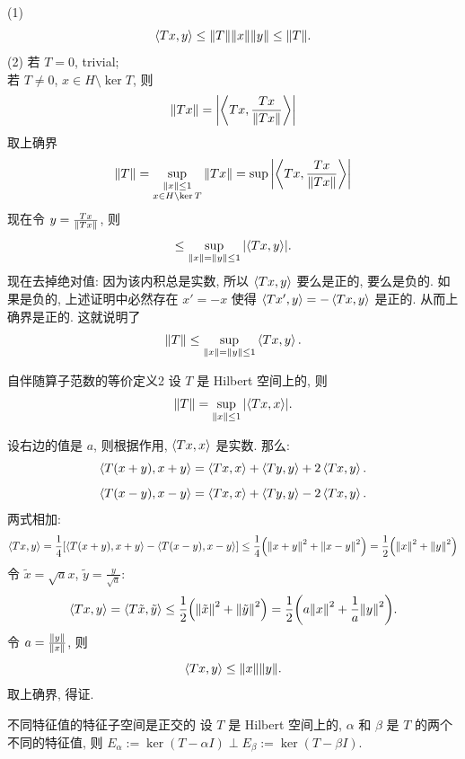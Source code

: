        \begin{prf}
            (1) 
            \[\expval{Tx, y}\leq\norm{T}\norm{x}\norm{y}\leq\norm{T}.  \]
            (2) 若 \(T=0\), trivial;\\
            若 \(T\neq 0\), \(x\in H\setminus\ker T\), 则
            \[\norm{Tx}=\abs{\expval{Tx, \frac{Tx}{\norm{Tx}}}}\]
            取上确界
            \[\norm{T}=\sup_{\substack{\norm{x}\leq 1 \\ x\in H\setminus\ker T}}\norm{Tx}=\sup\abs{\expval{Tx, \frac{Tx}{\norm{Tx}}}} \]
            现在令 \(y=\frac{Tx}{\norm{Tx}}\), 则
            \[\leq\sup_{\substack{\norm{x}=\norm{y}\leq 1}}\abs{\expval{Tx, y}}.\]
            现在去掉绝对值: 因为该内积总是实数, 所以 \(\expval{Tx, y}\) 要么是正的, 要么是负的. 如果是负的, 上述证明中必然存在 \(x'=-x\) 使得 \(\expval{Tx', y}=-\expval{Tx, y}\) 是正的. 从而上确界是正的. 这就说明了
            \[\norm{T}\leq\sup_{\substack{\norm{x}=\norm{y}\leq 1}}\expval{Tx, y}.\]
        \end{prf}

        \begin{thm}
            {自伴随算子范数的等价定义2}
            设 \(T\) 是 Hilbert 空间上的\SelfAdjOp{}, 则
            \[\norm{T}=\sup_{\norm{x}\leq 1}\abs{\expval{Tx, x}}.\]
        \end{thm}

        \begin{prf}
            设右边的值是 \(a\), 则根据\SelfAdjOp{}作用, \(\expval{Tx, x}\) 是实数. 那么:
            \[\expval{T(x+y), x+y}=\expval{Tx, x}+\expval{Ty, y}+2\expval{Tx, y}.\]
            \[\expval{T(x-y), x-y}=\expval{Tx, x}+\expval{Ty, y}-2\expval{Tx, y}.\]
            两式相加:
            \[\expval{Tx, y} = \frac{1}{4}[\expval{T(x+y), x+y}-\expval{T(x-y), x-y}]\leq\frac{1}{4}\qty(\norm{x+y}^2+\norm{x-y}^2)=\frac{1}{2}\qty(\norm{x}^2+\norm{y}^2) \]
            令 \(\tilde{x}=\sqrt{a}x\), \(\tilde{y}=\frac{y}{\sqrt{a}}\):
            \[\expval{Tx,y}=\expval{T\tilde{x}, \tilde{y}} \leq \frac{1}{2}\qty(\norm{\tilde{x}}^2+\norm{\tilde{y}}^2)=\frac{1}{2}\qty(a\norm{x}^2+\frac{1}{a}\norm{y}^2).\]
            令 \(a=\frac{\norm{y}}{\norm{x}}\), 则
            \[\expval{Tx, y} \leq \norm{x}\norm{y}.\]
            取上确界, 得证.
        \end{prf}

        \begin{thm}
            {不同特征值的特征子空间是正交的}
            设 \(T\) 是 Hilbert 空间上的\SelfAdjOp{}, \(\alpha\) 和 \(\beta\) 是 \(T\) 的两个不同的特征值, 则 \(E_\alpha:=\ker (T-\alpha I)\perp E_\beta:=\ker (T-\beta I)\).
        \end{thm}

